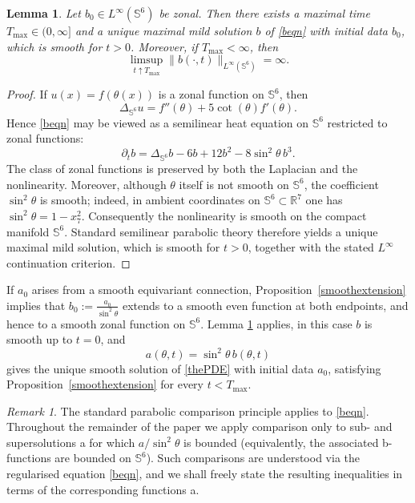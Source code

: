 \documentclass[11pt,a4paper]{article}
\numberwithin{equation}{section}
\theoremstyle{plain}
\newtheorem{lemma}[theorem]{Lemma}
\theoremstyle{remark}
\newtheorem{remark}[theorem]{Remark}
\begin{document}
\begin{lemma}\label{shrttime}
Let $b_0\in L^\infty(\mathbb{S}^6)$ be zonal. Then there exists a maximal time
$T_{\max}\in(0,\infty]$ and a unique maximal mild solution $b$ of \eqref{beqn} with initial data $b_0$, which is smooth for $t>0$. Moreover, if $T_{\max}<\infty$, then
$$
\limsup_{t\uparrow T_{\max}}
\|b(\cdot,t)\|_{L^\infty(\mathbb{S}^6)}
=
\infty.
$$
\end{lemma}

\begin{proof}
If $u(x)=f(\theta(x))$ is a zonal function on $\mathbb{S}^6$, then
$$
\Delta_{\mathbb{S}^6}u
=
f''(\theta)+5\cot(\theta)f'(\theta).
$$
Hence \eqref{beqn} may be viewed as a semilinear heat equation on
$\mathbb{S}^6$ restricted to zonal functions:
$$
\partial_t b
=
\Delta_{\mathbb{S}^6} b -6b+12b^2-8\sin^2\theta\,b^3.
$$
The class of zonal functions is preserved by both the Laplacian and the
nonlinearity. Moreover, although $\theta$ itself is not smooth on
$\mathbb{S}^6$, the coefficient $\sin^2\theta$ is smooth; indeed, in ambient
coordinates on $\mathbb{S}^6\subset\mathbb{R}^7$ one has $\sin^2\theta = 1-x_7^2$. Consequently the nonlinearity is smooth on the compact manifold
$\mathbb{S}^6$. Standard semilinear parabolic theory therefore yields a unique maximal mild solution, which is smooth for $t>0$, together with the stated $L^\infty$ continuation criterion.
\end{proof}

If $a_0$ arises from a smooth equivariant connection, Proposition~\ref{smoothextension} implies that $b_0:=\frac{a_0}{\sin^2\theta}$ extends to a smooth even function at both endpoints, and hence to a smooth zonal function on $\mathbb{S}^6$. Lemma \ref{shrttime} applies, in this case $b$ is smooth up to $t=0$, and
$$
a(\theta,t)=\sin^2\theta\,b(\theta,t)
$$
gives the unique smooth solution of \eqref{thePDE} with initial data $a_0$, satisfying Proposition~\ref{smoothextension} for every $t<T_{\max}$.

\begin{remark}
    The standard parabolic comparison principle applies to \eqref{beqn}. Throughout the remainder of the paper we apply comparison only to sub- and supersolutions a for which $a/\sin^2\theta$ is bounded (equivalently, the associated b-functions are bounded on $\mathbb S^6$). Such comparisons are understood via the regularised equation \eqref{beqn}, and we shall freely state the resulting inequalities in terms of the corresponding functions a.
\end{remark}
\end{document}
